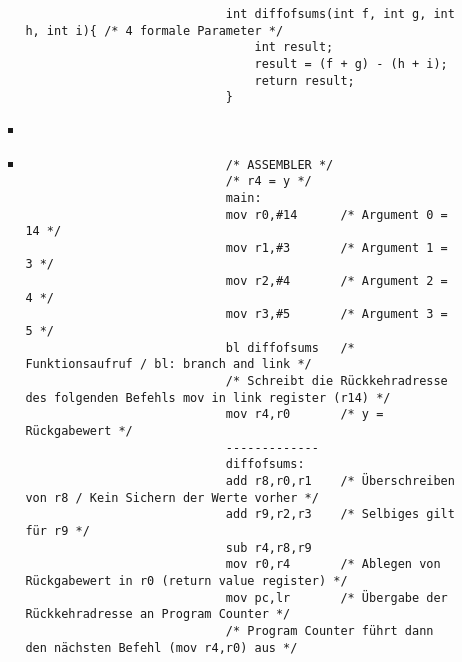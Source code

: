 \begin{itemize}
\begin{itemize}
\begin{itemize}
\begin{verbatim}
                            int diffofsums(int f, int g, int h, int i){ /* 4 formale Parameter */
                                int result;
                                result = (f + g) - (h + i);
                                return result;
                            }
                            \end{verbatim}
                        \item[]
                        \item[]
                            \begin{verbatim}
                            /* ASSEMBLER */
                            /* r4 = y */
                            main:
                            mov r0,#14      /* Argument 0 = 14 */
                            mov r1,#3       /* Argument 1 = 3 */
                            mov r2,#4       /* Argument 2 = 4 */
                            mov r3,#5       /* Argument 3 = 5 */
                            bl diffofsums   /* Funktionsaufruf / bl: branch and link */
                            /* Schreibt die Rückkehradresse des folgenden Befehls mov in link register (r14) */
                            mov r4,r0       /* y = Rückgabewert */
                            -------------
                            diffofsums:
                            add r8,r0,r1    /* Überschreiben von r8 / Kein Sichern der Werte vorher */
                            add r9,r2,r3    /* Selbiges gilt für r9 */
                            sub r4,r8,r9
                            mov r0,r4       /* Ablegen von Rückgabewert in r0 (return value register) */
                            mov pc,lr       /* Übergabe der Rückkehradresse an Program Counter */
                            /* Program Counter führt dann den nächsten Befehl (mov r4,r0) aus */
                            \end{verbatim}
                    \end{itemize}
            \end{itemize}
    \end{itemize}
        
\pagebreak

